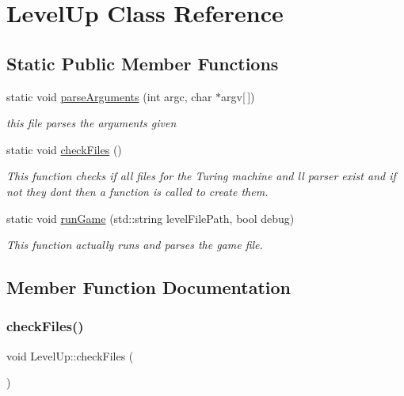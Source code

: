\hypertarget{classLevelUp}{}\section{Level\+Up Class Reference}
\label{classLevelUp}
\subsection*{Static Public Member Functions}
\begin{DoxyCompactItemize}
\item 
static void \hyperlink{classLevelUp_abfbb1057ebe51f215fbcbdb61a887f85}{parse\+Arguments} (int argc, char $\ast$argv\mbox{[}$\,$\mbox{]})
\begin{DoxyCompactList}\small\item\em this file parses the arguments given \end{DoxyCompactList}\item 
static void \hyperlink{classLevelUp_a749a173244e4485b7eea1bd4ed68bf8a}{check\+Files} ()
\begin{DoxyCompactList}\small\item\em This function checks if all files for the Turing machine and ll parser exist and if not they don\textquotesingle{}t then a function is called to create them. \end{DoxyCompactList}\item 
static void \hyperlink{classLevelUp_afee839cbfb2300f6229b4d82bbf2c269}{run\+Game} (std\+::string level\+File\+Path, bool debug)
\begin{DoxyCompactList}\small\item\em This function actually runs and parses the game file. \end{DoxyCompactList}\end{DoxyCompactItemize}


\subsection{Member Function Documentation}
\mbox{\label{classLevelUp_a749a173244e4485b7eea1bd4ed68bf8a}} 
\subsubsection{\texorpdfstring{check\+Files()}{checkFiles()}}
{\footnotesize\ttfamily void Level\+Up\+::check\+Files (\begin{DoxyParamCaption}{ }\end{DoxyParamCaption})\hspace{0.3cm}{\ttfamily [static]}}



